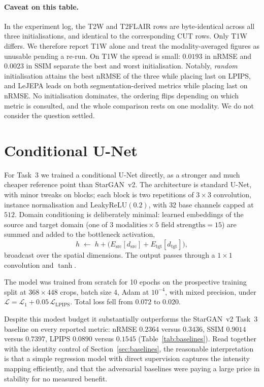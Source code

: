 \documentclass[11pt,a4paper]{article}
\newcommand{\rmse}{nRMSE}
\begin{document}
\paragraph{Caveat on this table.} In the experiment log, the T2W and T2FLAIR rows are byte-identical
across all three initialisations, and identical to the corresponding CUT rows. Only T1W differs. We
therefore report T1W alone and treat the modality-averaged figures as unusable pending a re-run. On
T1W the spread is small: $\num{0.0193}$ in \rmse{} and $\num{0.0023}$ in SSIM separate the best and
worst initialisation. Notably, \emph{random} initialisation attains the best \rmse{} of the three while
placing last on LPIPS, and LeJEPA leads on both segmentation-derived metrics while placing last on
\rmse{}. No initialisation dominates, the ordering flips depending on which metric is consulted, and
the whole comparison rests on one modality. We do not consider the question settled.

\section{Conditional U-Net}
\label{sec:unet}

For Task~3 we trained a conditional U-Net directly, as a stronger and much cheaper reference point
than StarGAN~v2. The architecture is standard U-Net, with minor tweaks on blocks; 
each block is two repetitions of $3\times3$ convolution, instance normalisation and LeakyReLU$(0.2)$, 
with $32$ base channels capped at $512$. 
Domain conditioning is deliberately minimal: learned embeddings of the source and target domain
(one of $3 \text{ modalities} \times 5 \text{ field strengths} = 15$) are summed and added to the
bottleneck activation,
\begin{equation}
  h \;\leftarrow\; h + \big(E_{\text{src}}[d_{\text{src}}] + E_{\text{tgt}}[d_{\text{tgt}}]\big),
\end{equation}
broadcast over the spatial dimensions. The output passes through a $1\times1$ convolution and $\tanh$.

The model was trained from scratch for 10 epochs on the prospective training split at
$368 \times 448$ crops, batch size 4, Adam at $10^{-4}$, with mixed precision, under
$\mathcal{L} = \mathcal{L}_1 + 0.05\,\mathcal{L}_{\text{LPIPS}}$. Total loss fell from $0.072$ to
$0.020$.

Despite this modest budget it substantially outperforms the StarGAN~v2 Task~3 baseline on every
reported metric: \rmse{} $0.2364$ versus $0.3436$, SSIM $0.9014$ versus $0.7397$, LPIPS $0.0890$
versus $0.1545$ (Table~\ref{tab:baselines}). Read together with the identity control of
Section~\ref{sec:baselines}, the reasonable interpretation is that a simple regression model with
direct supervision captures the intensity mapping efficiently, and that the adversarial baselines were
paying a large price in stability for no measured benefit.
\end{document}
